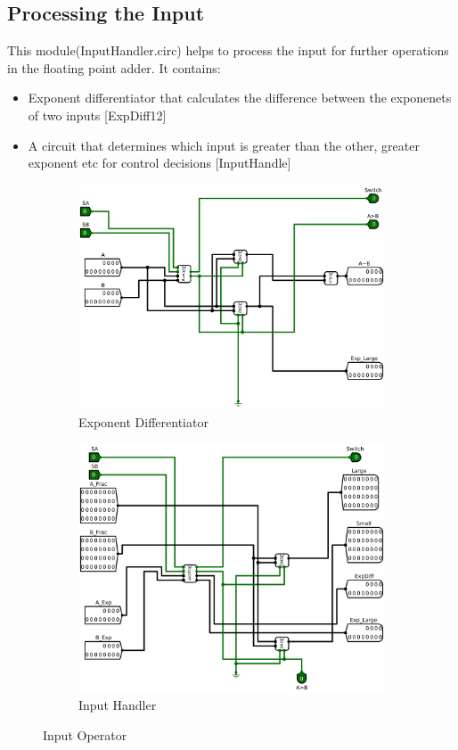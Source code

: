 \documentclass[12pt]{article}
\begin{document}
\subsection{Processing the Input}
This module(InputHandler.circ) helps to process the input for further operations in the floating point adder. It contains:
\begin{itemize}
    \item Exponent differentiator that calculates the difference between the exponenets of two inputs [ExpDiff12]
    \item A circuit that determines which input is greater than the other, greater exponent etc for control decisions [InputHandle]
\end{itemize}
\begin{figure}[H]
\centering
 \begin{subfigure}[b]{0.45\textwidth}
  \includegraphics[width=\textwidth]{Images/ExpDiff12.png}
  \caption{Exponent Differentiator}
  \label{fig:expdiff}
  \end{subfigure}
  \hfill
  \begin{subfigure}[b]{0.45\textwidth}
  \includegraphics[width=\textwidth]{Images/InputHandle.png}
  \caption{Input Handler}
  \label{fig:inphandle}
  \end{subfigure}
 \caption{Input Operator}\label{fig:inpproc}
\end{figure}
\end{document}
